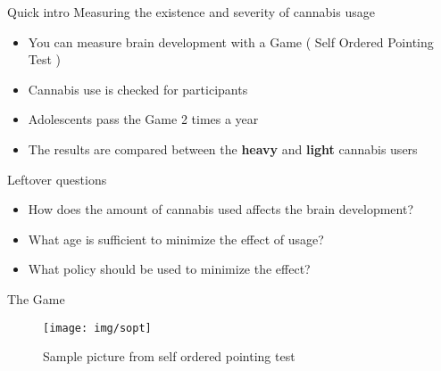 \documentclass{beamer}
\begin{document}
\begin{frame}{Quick intro}
Measuring the existence and severity of cannabis usage
    \begin{itemize}
        \item You can measure brain development with a Game ( Self Ordered Pointing Test \cite{sopt})
        \item Cannabis use is checked for participants
        \item Adolescents pass the Game 2 times a year
        \item The results are compared between the \textbf{heavy} and \textbf{light} cannabis users
    \end{itemize}
Leftover questions
\begin{itemize}
    \item How does the amount of cannabis used affects the brain development?
    \item What age is sufficient to minimize the effect of usage?
    \item What policy should be used to minimize the effect?
\end{itemize}
\end{frame}
\begin{frame}{The Game}
    \begin{figure}
        \centering
        \texttt{[image: img/sopt]}
        \caption{Sample picture from self ordered pointing test}
        \label{fig:my_label}
    \end{figure}
\end{frame}
\end{document}
